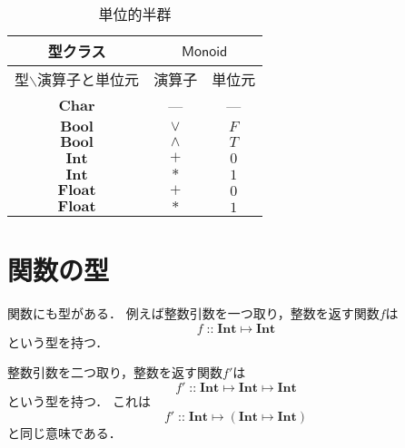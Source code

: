 \documentclass[twocolumn]{jsbook}
\newcommand{\hsklType}[1]{\textbf{#1}}
\newcommand{\hsklTypeclass}[1]{\mathsf{#1}}
\newcommand{\hsklBool}{\hsklType{Bool}}
\newcommand{\hsklChar}{\hsklType{Char}}
\newcommand{\hsklInt}{\hsklType{Int}}
\newcommand{\hsklFloat}{\hsklType{Float}}
\newcommand{\hsklMonoid}{\hsklTypeclass{Monoid}}
\DeclareMathOperator{\mathIn}{::}
\DeclareMathOperator{\mathMapsTo}{\mapsto}
\newcommand{\mathMorph}[2]{#1\mathMapsTo#2}
\newcommand{\mathMorphII}[3]{#1\mathMapsTo#2\mathMapsTo#3}
\newcommand{\mathMorphIIWithParenthesis}[3]{#1\mathMapsTo(#2\mathMapsTo#3)}
\begin{document}
\begin{table}
\caption{単位的半群}
\label{tab:monoids}
\begin{center}
\begin{tabular}{||c||c|c||}
\hline
型クラス
    &\multicolumn{2}{|c||}{$\hsklMonoid$}\\
\hline\hline
型$\backslash$演算子と単位元
    &演算子
    &単位元\\
\hline
$\hsklChar$
    &---
    &---\\
\hline
$\hsklBool$
    &$\vee$
    &$F$\\
\hline
$\hsklBool$
    &$\wedge$
    &$T$\\
\hline
$\hsklInt$
    &$+$
    &$0$\\
\hline
$\hsklInt$
    &$*$
    &$1$\\
\hline
$\hsklFloat$
    &$+$
    &$0$\\
\hline
$\hsklFloat$
    &$*$
    &$1$\\
\hline
\end{tabular}
\end{center}
\end{table}

\section{関数の型}

関数にも型がある．
例えば整数引数を一つ取り，整数を返す関数$f$は$$f\mathIn\mathMorph{\hsklInt}{\hsklInt}$$という型を持つ．

整数引数を二つ取り，整数を返す関数$f'$は$$f'\mathIn\mathMorphII{\hsklInt}{\hsklInt}{\hsklInt}$$という型を持つ．
これは$$f'\mathIn\mathMorphIIWithParenthesis{\hsklInt}{\hsklInt}{\hsklInt}$$と同じ意味である．
\end{document}
